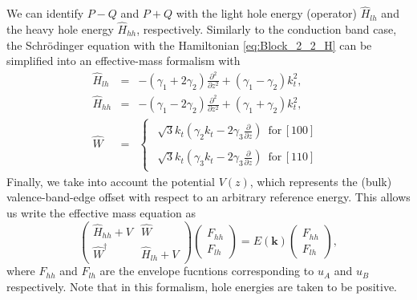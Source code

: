 We can identify $P-Q$ and $P+Q$ with the light hole energy (operator)
$\hat{H}_{lh}$ and the heavy hole energy $\hat{H}_{hh}$, respectively.
Similarly to the conduction band case, the Schr\"{o}dinger  equation
with the Hamiltonian \ref{eq:Block_2_2_H} can be simplified into
an effective-mass formalism with \begin{eqnarray}
\hat{H}_{lh} & = & -\left(\gamma_{1}+2\gamma_{2}\right)\frac{\partial^{2}}{\partial z^{2}}+\left(\gamma_{1}-\gamma_{2}\right)k_{t}^{2},\\
\hat{H}_{hh} & = & -\left(\gamma_{1}-2\gamma_{2}\right)\frac{\partial^{2}}{\partial z^{2}}+\left(\gamma_{1}+\gamma_{2}\right)k_{t}^{2},\\
\hat{W} & = & \left\{ \begin{array}{c}
\begin{array}{c}
\sqrt{3}k_{t}\left(\gamma_{2}k_{t}-2\gamma_{3}\frac{\partial}{\partial z}\right)\,\,\,\textrm{for}\,[100]\end{array}\\
\begin{array}{c}
\sqrt{3}k_{t}\left(\gamma_{3}k_{t}-2\gamma_{3}\frac{\partial}{\partial z}\right)\,\,\,\textrm{for}\,[110]\end{array}\end{array}\right.\end{eqnarray}
Finally, we take into account the potential $V(z)$, which represents
the (bulk) valence-band-edge offset with respect to an arbitrary reference
energy. This allows us write the effective mass equation as \begin{equation}
\left(\begin{array}{cc}
\hat{H}_{hh}+V & \hat{W}\\
\hat{W}^{\dagger} & \hat{H}_{lh}+V\end{array}\right)\left(\begin{array}{c}
F_{hh}\\
F_{lh}\end{array}\right)=E(\mathbf{k})\left(\begin{array}{c}
F_{hh}\\
F_{lh}\end{array}\right),\label{eq:Effective_Mass_Equation}\end{equation}
where $F_{hh}$ and $F_{lh}$ are the envelope fucntions corresponding
to $u_{A}$ and $u_{B}$ respectively. Note that in this formalism,
hole energies are taken to be positive.

